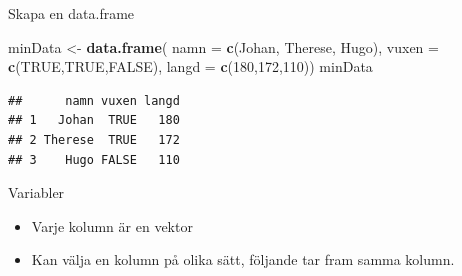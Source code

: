 \documentclass[
  11pt,
  ignorenonframetext,
]{beamer}
\newenvironment{Shaded}{\begin{snugshade}}{\end{snugshade}}
\newcommand{\DataTypeTok}[1]{\textcolor[rgb]{0.13,0.29,0.53}{#1}}
\newcommand{\DecValTok}[1]{\textcolor[rgb]{0.00,0.00,0.81}{#1}}
\newcommand{\KeywordTok}[1]{\textcolor[rgb]{0.13,0.29,0.53}{\textbf{#1}}}
\newcommand{\NormalTok}[1]{#1}
\newcommand{\OperatorTok}[1]{\textcolor[rgb]{0.81,0.36,0.00}{\textbf{#1}}}
\newcommand{\OtherTok}[1]{\textcolor[rgb]{0.56,0.35,0.01}{#1}}
\newcommand{\StringTok}[1]{\textcolor[rgb]{0.31,0.60,0.02}{#1}}
\providecommand{\tightlist}{%
  \setlength{\itemsep}{0pt}\setlength{\parskip}{0pt}}
\begin{document}
\begin{frame}[fragile]{Skapa en data.frame}
\protect\hypertarget{skapa-en-data.frame}{}
\begin{Shaded}
\begin{Highlighting}[]
\NormalTok{minData \textless{}{-}}\StringTok{ }\KeywordTok{data.frame}\NormalTok{(}
  \DataTypeTok{namn =} \KeywordTok{c}\NormalTok{(}\StringTok{\textquotesingle{}Johan\textquotesingle{}}\NormalTok{, }\StringTok{\textquotesingle{}Therese\textquotesingle{}}\NormalTok{, }\StringTok{\textquotesingle{}Hugo\textquotesingle{}}\NormalTok{), }
  \DataTypeTok{vuxen =} \KeywordTok{c}\NormalTok{(}\OtherTok{TRUE}\NormalTok{,}\OtherTok{TRUE}\NormalTok{,}\OtherTok{FALSE}\NormalTok{), }
  \DataTypeTok{langd =} \KeywordTok{c}\NormalTok{(}\DecValTok{180}\NormalTok{,}\DecValTok{172}\NormalTok{,}\DecValTok{110}\NormalTok{))}
\NormalTok{minData}
\end{Highlighting}
\end{Shaded}

\begin{verbatim}
##      namn vuxen langd
## 1   Johan  TRUE   180
## 2 Therese  TRUE   172
## 3    Hugo FALSE   110
\end{verbatim}
\end{frame}

\begin{frame}[fragile]{Variabler}
\protect\hypertarget{variabler}{}
\begin{itemize}
\tightlist
\item
  Varje kolumn är en vektor
\item
  Kan välja en kolumn på olika sätt, följande tar fram samma kolumn.
\end{itemize}

\begin{Shaded}
\end{Shaded}
\end{frame}
\end{document}
